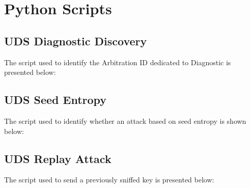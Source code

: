 \chapter{Python Scripts}\label{ch:apda}



\section{UDS Diagnostic Discovery}\label{uds_diagnostic_discovery}
The script used to identify the Arbitration ID dedicated to Diagnostic is presented below:



\section{UDS Seed Entropy}\label{uds_seed_entropy}
The script used to identify whether an attack based on seed entropy is shown below:



\section{UDS Replay Attack}\label{uds_replay_attack}
The script used to send a previously sniffed key is presented below:
